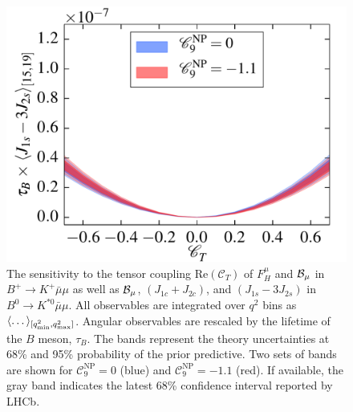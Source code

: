 \documentclass[twocolumn,epjc3]{svjour3}
\numberwithin{equation}{section}
\newcommand{\wilson}[2][{}]{\mathcal{C}_{#2}^{\mathrm{#1}}}
\renewcommand{\[}{\big[}
\renewcommand{\]}{\big]}
\renewcommand{\(}{\big(}
\renewcommand{\)}{\big)}
\newlength{\relwidth}
\begin{document}
\begin{figure}
\begin{center}
    \includegraphics[width=\relwidth]{plots/pdf/ct_Kstar_J_1s_minus_3J_2s15to19}
  \end{center}
  \caption{ The sensitivity to the tensor coupling
    $\mbox{Re}(\wilson{T})$ of $F_H^\mu$ and {${\cal B}_\mu$} in $B^+
    \to K^+ \bar\mu\mu$ {as well as} {${\cal B}_\mu$},
    $(J_{1c} + J_{2c})$, and $(J_{1s}-3 J_{2s})$ in $B^0 \to K^{*0}
    \bar\mu\mu$. All observables are integrated over $q^2$ bins as
    $\langle \dots \rangle_{[q^2_{\rm min}, q^2_{\rm max}]}$. Angular
    observables are rescaled by the lifetime of the $B$ meson,
    $\tau_B$. The bands represent the theory uncertainties at 68\% and
    95\% probability of the prior predictive.  Two sets of bands are
    shown for $\wilson[NP]{9} = 0$ (blue) and $\wilson[NP]{9} = -1.1$
    (red). If available, the gray band indicates the latest 68\%
    confidence interval reported by LHCb.}
  \label{fig:FHvsCT}
\end{figure}
\end{document}
